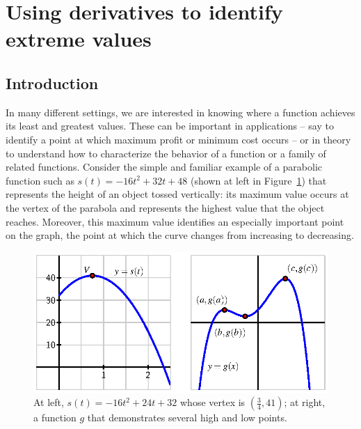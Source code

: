 \section{Using derivatives to identify extreme values} \label{S:3.1.Tests}

\vspace*{-14 pt}

\subsection*{Introduction}

In many different settings, we are interested in knowing where a function achieves its least and greatest values.  These can be important in applications -- say to identify a point at which maximum profit or minimum cost occurs -- or in theory to understand how to characterize the behavior of a function or a family of related functions.  Consider the simple and familiar example of a parabolic function such as $s(t) = -16t^2 + 32t + 48$ (shown at left in Figure~\ref{F:3.1.Intro}) that represents the height of an object tossed vertically:  its maximum value occurs at the vertex of the parabola and represents the highest value that the object reaches.  Moreover, this maximum value identifies an especially important point on the graph, the point at which the curve changes from increasing to decreasing.

\begin{figure}[h]
\begin{center}
\includegraphics{figures/3_1_Intro.eps}
\caption{At left, $s(t) = -16t^2 + 24t + 32$ whose vertex is $(\frac{3}{4}, 41)$; at right, a function $g$ that demonstrates several high and low points.} \label{F:3.1.Intro}
\end{center}
\end{figure}

